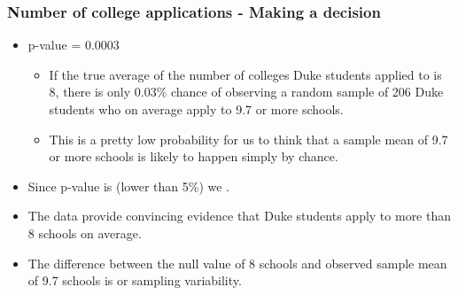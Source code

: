 
\begin{frame}
\frametitle{Number of college applications - Making a decision}

\begin{itemize}

\item p-value = 0.0003

\pause

\begin{itemize}
\item If the true average of the number of colleges Duke students applied to is 8, there is only 0.03\% chance of observing a random sample of 206 Duke students who on average apply to 9.7 or more schools.
\pause
\item This is a pretty low probability for us to think that a sample mean of 9.7 or more schools is likely to happen simply by chance.
\end{itemize}

\pause
\item Since p-value is  (lower than 5\%) we .

\pause
\item The data provide convincing evidence that Duke students apply to more than 8 schools on average.

\pause
\item The difference between the null value of 8 schools and observed sample mean of 9.7 schools is  or sampling variability.

\end{itemize}

\end{frame}


